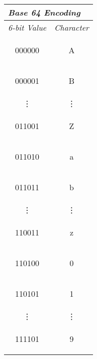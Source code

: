\begin{tabular}{|c|c|} \hline
  \multicolumn{2}{|l|}{\textit{Base 64 Encoding}} \\ \hline\hline
  \textit{6-bit Value} & \textit{Character} \\ \hline
  \begin{code}000000\end{code} & \begin{code}A\end{code} \\
  \begin{code}000001\end{code} & \begin{code}B\end{code} \\
  \vdots & \vdots \\
  \begin{code}011001\end{code} & \begin{code}Z\end{code} \\
  \begin{code}011010\end{code} & \begin{code}a\end{code} \\
  \begin{code}011011\end{code} & \begin{code}b\end{code} \\
  \vdots & \vdots \\
  \begin{code}110011\end{code} & \begin{code}z\end{code} \\
  \begin{code}110100\end{code} & \begin{code}0\end{code} \\
  \begin{code}110101\end{code} & \begin{code}1\end{code} \\
  \vdots & \vdots \\
  \begin{code}111101\end{code} & \begin{code}9\end{code} \\

\end{tabular}
